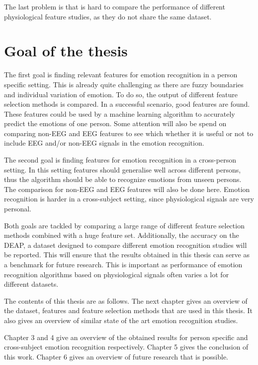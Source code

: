 \npar

The last problem is that is hard to compare the performance of different physiological feature studies, as they do not share the same dataset.

\section{Goal of the thesis}
The first goal is finding relevant features for emotion recognition in a person specific setting. This is already quite challenging as there are fuzzy boundaries and individual variation of emotion\citep{emorecoghard}. To do so, the output of different feature selection methods is compared. In a successful scenario, good features are found. These features could be used by a machine learning algorithm to accurately predict the emotions of one person. Some attention will also be spend on comparing non-EEG and EEG features to see which whether it is useful or not to include EEG and/or non-EEG signals in the emotion recognition.

\npar

The second goal is finding features for emotion recognition in a cross-person setting. In this setting features should generalise well across different persons, thus the algorithm should be able to recognize emotions from unseen persons. The comparison for non-EEG and EEG features will also be done here. Emotion recognition is harder in a cross-subject setting, since physiological signals are very personal\citep{DEAP}.

\npar 

Both goals are tackled by comparing a large range of different feature selection methods combined with a huge feature set. Additionally, the accuracy on the DEAP, a dataset designed to compare different emotion recognition studies\citep{DEAP} will be reported. This will ensure that the results obtained in this thesis can serve as a benchmark for future research. This is important as performance of emotion recognition algorithms based on physiological signals often varies a lot for different datasets\citep{PhytoEm}.

\npar 

The contents of this thesis are as follows. The next chapter gives an overview of the dataset, features and feature selection methods that are used in this thesis. It also gives an overview of similar state of the art emotion recognition studies.
 
\npar
Chapter 3 and 4 give an overview of the obtained results for person specific and cross-subject emotion recognition respectively. Chapter 5 gives the conclusion of this work. Chapter 6 gives an overview of future research that is possible.